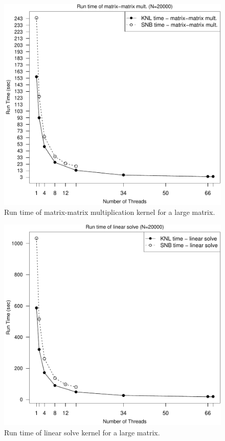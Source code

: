 \begin{figure}
\includegraphics[height=\columnwidth, width=\columnwidth]{matmat_20000_68-rt.pdf}
\caption{Run time of matrix-matrix multiplication kernel for a large matrix.}
\label{fig:largeLinsolveTime}
\end{figure}

\begin{figure}
\includegraphics[height=\columnwidth, width=\columnwidth]{linsolve_20000_68-rt.pdf}
\caption{Run time of linear solve kernel for a large matrix.}
\label{fig:largeLinsolveTime}
\end{figure}


